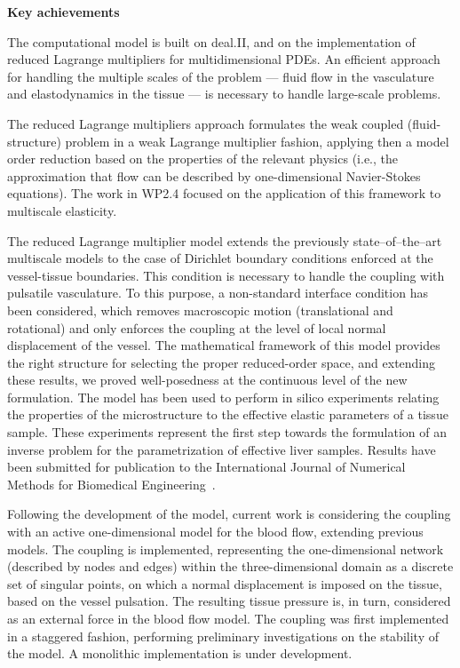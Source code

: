 \documentclass[a4paper,12pt, numbers]{article}
\begin{document}
\noindent\textbf{Key achievements}

The computational model is built on deal.II, and on the implementation of reduced Lagrange multipliers for multidimensional PDEs. An efficient approach for handling the multiple scales of the problem --- fluid flow in the vasculature and elastodynamics in the tissue --- is necessary to handle large-scale problems.

The reduced Lagrange multipliers approach formulates the weak coupled (fluid-structure) problem in a weak Lagrange multiplier fashion, applying then a model order reduction based on the properties of the relevant physics (i.e., the approximation that flow can be described by one-dimensional Navier-Stokes equations). The work in WP2.4 focused on the application of this framework to multiscale elasticity.

The reduced Lagrange multiplier model extends the previously state--of--the--art multiscale models to the case of Dirichlet boundary conditions enforced at the vessel-tissue boundaries. This condition is necessary to handle the coupling with pulsatile vasculature. To this purpose, a non-standard interface condition has been considered, which removes macroscopic motion (translational and rotational) and only enforces the coupling at the level of local normal displacement of the vessel. The mathematical framework of this model provides the right structure for selecting the proper reduced-order space, and extending these results, we proved well-posedness at the continuous level of the new formulation. The model has been used to perform in silico experiments relating the properties of the microstructure to the effective elastic parameters of a tissue sample. These experiments represent the first step towards the formulation of an inverse problem for the parametrization of effective liver samples. Results have been submitted for publication to the International Journal of Numerical Methods for Biomedical Engineering~\cite{belponer2025}.

Following the development of the model, current work is considering the coupling with an active one-dimensional model for the blood flow, extending previous models. The coupling is implemented, representing the one-dimensional network (described by nodes and edges) within the three-dimensional domain as a discrete set of singular points, on which a normal displacement is imposed on the tissue, based on the vessel pulsation. The resulting tissue pressure is, in turn, considered as an external force in the blood flow model. The coupling was first implemented in a staggered fashion, performing preliminary investigations on the stability of the model. A monolithic implementation is under development.
\end{document}
